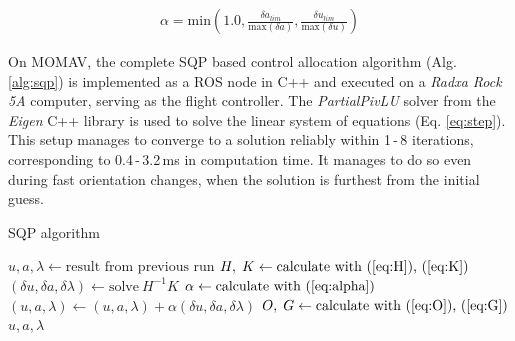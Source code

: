 \documentclass[conference]{IEEEtran}
\begin{document}
\par
\begin{align}
	\alpha = \mathrm{min}(1.0, \frac{\delta a_{lim}}{\mathrm{max}(\delta a)}, \frac{\delta u_{lim}}{\mathrm{max}(\delta u)}) \label{eq:alpha}
\end{align}
\vspace{0pt}\par
On MOMAV, the complete SQP based control allocation algorithm (Alg. \ref{alg:sqp}) is implemented as a ROS node in C++ and executed on a \textit{Radxa Rock 5A} computer, serving as the flight controller. The \textit{PartialPivLU} solver from the \textit{Eigen} C++ library is used to solve the linear system of equations (Eq. \ref{eq:step}). This setup manages to converge to a solution reliably within 1\,-\,8 iterations, corresponding to 0.4\,-\,3.2\,ms in computation time. It manages to do so even during fast orientation changes, when the solution is furthest from the initial guess.
\vspace{6pt}\par
\begin{algorithm}
	\caption{SQP algorithm}\label{alg:sqp}
	\begin{algorithmic}
		\State $u,a,\lambda \gets \text{result from previous run}$
		\Repeat
		\State $H,\;K \gets \text{calculate with (\ref{eq:H}), (\ref{eq:K})}$
		\State $(\delta u, \delta a, \delta \lambda) \gets \text{solve}\ H^{-1}K$
		\State $\alpha \gets \text{calculate with (\ref{eq:alpha})}$
		\State $(u,a,\lambda) \gets (u,a,\lambda) + \alpha (\delta u, \delta a, \delta \lambda)$
		\State $O,\;G \gets \text{calculate with (\ref{eq:O}), (\ref{eq:G})}$
		\State \Return $u,a,\lambda$
	\end{algorithmic}
\end{algorithm}
\par
\end{document}
